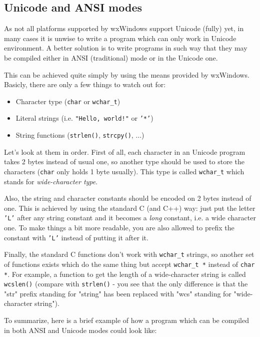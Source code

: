 \subsection{Unicode and ANSI modes}

As not all platforms supported by wxWindows support Unicode (fully) yet, in
many cases it is unwise to write a program which can only work in Unicode
environment. A better solution is to write programs in such way that they may
be compiled either in ANSI (traditional) mode or in the Unicode one.

This can be achieved quite simply by using the means provided by wxWindows.
Basicly, there are only a few things to watch out for:

\begin{itemize}
\item Character type ({\tt char} or {\tt wchar\_t})
\item Literal strings (i.e. {\tt "Hello, world!"} or {\tt '*'})
\item String functions ({\tt strlen()}, {\tt strcpy()}, ...)
\end{itemize}

Let's look at them in order. First of all, each character in an Unicode
program takes 2 bytes instead of usual one, so another type should be used to
store the characters ({\tt char} only holds 1 byte usually). This type is
called {\tt wchar\_t} which stands for {\it wide-character type}.

Also, the string and character constants should be encoded on 2 bytes instead
of one. This is achieved by using the standard C (and C++) way: just put the
letter {\tt 'L'} after any string constant and it becomes a {\it long}
constant, i.e. a wide character one. To make things a bit more readable, you
are also allowed to prefix the constant with {\tt 'L'} instead of putting it
after it.

Finally, the standard C functions don't work with {\tt wchar\_t} strings, so
another set of functions exists which do the same thing but accept 
{\tt wchar\_t *} instead of {\tt char *}. For example, a function to get the
length of a wide-character string is called {\tt wcslen()} (compare with 
{\tt strlen()} - you see that the only difference is that the "str" prefix
standing for "string" has been replaced with "wcs" standing for
"wide-character string").

To summarize, here is a brief example of how a program which can be compiled
in both ANSI and Unicode modes could look like:

